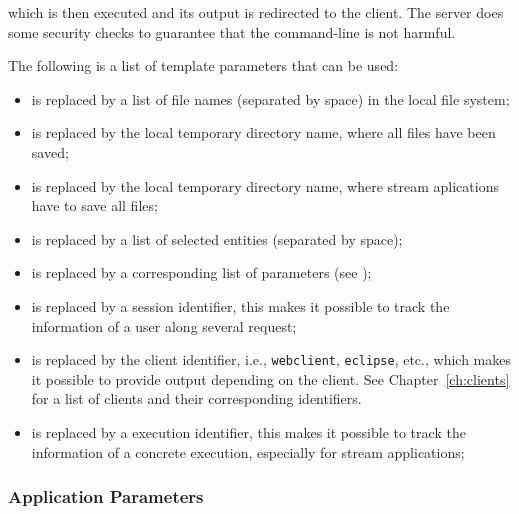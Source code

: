 {  \bigskip 
  \noindent
  which is then executed and its output is redirected to the
  client. The server does some security checks to guarantee that the
  command-line is not harmful. %

  \bigskip 
  \noindent
  The following is a list of template parameters that can be used:

  \begin{itemize}
  \item {} is replaced by a list of file
    names (separated by space) in the local file system;

  \item {} is replaced by the local
    temporary directory name, where all files have been saved;

  \item {} is replaced by the local
    temporary directory name, where stream aplications have to save
    all files; 
  \item {} is replaced by a list of
    selected entities (separated by space);
  \item {} is replaced by a
    corresponding list of parameters (see );
  \item {} is replaced by a session
    identifier, this makes it possible to track the information of a
    user along several request;
  \item {} is replaced by the client
    identifier, i.e., \texttt{webclient}, \texttt{eclipse}, etc.,
    which makes it possible to provide output depending on the
    client. See Chapter~\ref{ch:clients} for a list of clients and
    their corresponding identifiers.
%
  \item {} is replaced by a execution
    identifier, this makes it possible to track the information of a
    concrete execution, especially for stream applications;
  \end{itemize}
%
}


\subsubsection{Application Parameters}

